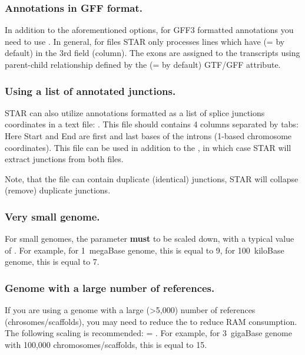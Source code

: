 \documentclass[12pt]{article}
\begin{document}
\subsubsection{Annotations in GFF format.}
In addition to the aforementioned options, for GFF3 formatted annotations you need to use  . In general, for  files STAR only processes lines which have  (= by default) in the 3rd field (column). The exons are assigned to the transcripts using parent-child relationship defined by the  (= by default) GTF/GFF attribute.

\subsubsection{Using a list of annotated junctions.}
STAR can also utilize annotations formatted as a list of splice junctions coordinates in a text file:  . This file should contains 4 columns separated by tabs:
Here Start and End are first and last bases of the introns (1-based chromosome coordinates).
This file can be used in addition to the , in which case STAR will extract junctions from both files.

Note, that the  file can contain duplicate (identical) junctions, STAR will collapse (remove) duplicate junctions.

\subsubsection{Very small genome.}
For small genomes, the parameter  \textbf{must} to be scaled down, with a typical value of . For example, for 1~megaBase genome, this is equal to 9, for 100~kiloBase genome, this is equal to 7.

\subsubsection{Genome with a large number of references.}
If you are using a genome with a large (\textgreater 5,000) number of references (chrosomes/scaffolds), you may need to reduce the  to reduce RAM consumption. The following scaling is recommended:  = . For example, for 3~gigaBase genome with 100,000 chromosomes/scaffolds, this is equal to 15.
\end{document}
